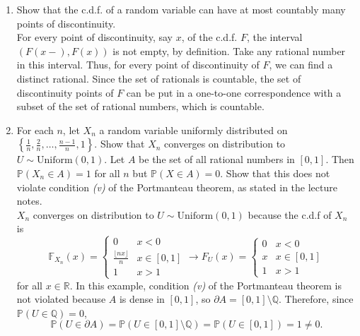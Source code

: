 \documentclass[12pt]{article}
\begin{document}
\begin{enumerate}
 
 \item Show that the c.d.f. of a random variable can have at most countably many points of discontinuity.\\
\color{blue}
For every point of discontinuity, say $x$, of the c.d.f. $F$, the  interval  $(F(x-), F(x))$ is not empty, by definition. Take any rational number in this interval. Thus, for every point of discontinuity of $F$, we can find a distinct rational. Since the set of rationals is countable, the set of discontinuity points of $F$ can be put in a one-to-one correspondence with a subset of the set of rational numbers, which is countable. 
\color{black}
 \item For each $n$, let $X_n$ a random variable uniformly distributed on $\left\{\frac{1}{n}, \frac{2}{n}, \ldots, \frac{n-1}{n}, 1 \right\}$. Show that $X_n$ converges on distribution to $U \sim \mathrm{Uniform}(0,1)$. Let $A$ be the set of all rational numbers in $[0,1]$. Then $\mathbb{P}(X_n \in A) = 1$ for all $n$ but $\mathbb{P}(X \in A) = 0$. Show that this does not violate condition {\it (v)} of the Portmanteau theorem, as stated in the lecture notes.\\
 \color{blue}
 $X_n$ converges on distribution to $U \sim \mathrm{Uniform}(0,1)$ because the c.d.f of $X_n$ is
 \[
\mathbb{F}_{X_n}(x) = \left\{ \begin{array}{cc}
 	0 & x < 0\\
 	\frac{\lfloor n x \rfloor }{n} & x \in [0,1]\\
 	1 & x >1
 	 \end{array} \right.
 	\to F_{U}(x) = \left\{ \begin{array}{cc}
 	0 & x < 0\\
 x & x \in [0,1]\\
 	1 & x >1
 \end{array} \right.
 \]
 for all $x \in \mathbb{R}$. In this example, condition {\it (v)} of the Portmanteau theorem is not violated because $A$ is dense in $[0,1]$, so $\partial{A} = [0,1] \setminus \mathbb{Q}$. Therefore, since $\mathbb{P}( U \in \mathbb{Q}) = 0$,
 \[
 \mathbb{P}( U \in \partial{A}) = \mathbb{P}( U \in  [0,1] \setminus \mathbb{Q})
 = \mathbb{P}( U \in [0,1]) = 1 \neq 0.
 \]
 \color{black}

  \end{enumerate}
\end{document}
